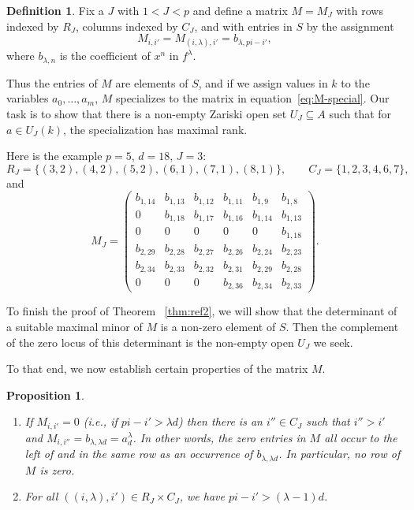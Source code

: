 \documentclass[12pt,reqno]{amsart}
\numberwithin{equation}{section}
\theoremstyle{plain}
\newtheorem{prop}[subsection]{Proposition}
\theoremstyle{definition}
\newtheorem{defn}[subsection]{Definition}
\theoremstyle{remark}
\numberwithin{equation}{section}
\newcommand{\<}{\langle}
\renewcommand{\>}{\rangle}
\begin{document}
\begin{defn}\label{def:M-generic}
Fix a $J$ with $1<J<p$ and define a matrix $M=M_J$ with rows indexed
by $R_J$, columns indexed by $C_J$, and with entries in $S$ by the
assignment
\begin{equation*}
M_{i,i'}=M_{(i,\lambda),i'}=b_{\lambda,pi-i'},
\end{equation*}
where $b_{\lambda,n}$ is the coefficient of $x^n$ in $f^\lambda$.
\end{defn}

Thus the entries of $M$ are elements of $S$, and if we assign values
in $k$ to the variables $a_0,\dots,a_m$, $M$
specializes to the matrix in equation~\eqref{eq:M-special}.  Our task
is to show that there is a non-empty Zariski open set $U_J\subseteq A$
such that for $a\in U_J(k)$, the specialization has maximal rank.

Here is the example $p=5$, $d=18$, $J=3$:
\[R_J=\{(3,2),(4,2),(5,2),(6,1),(7,1),(8,1)\},
  \qquad
  C_J=\{1,2,3,4,6,7\},\]
and
\[M_J=\begin{pmatrix}
b_{1,14}&b_{1,13}&b_{1,12}&b_{1,11}&b_{1,9}&b_{1,8}\\
0&b_{1,18}&b_{1,17}&b_{1,16}&b_{1,14}&b_{1,13}\\
0&0&0&0&0&b_{1,18}\\
b_{2,29}&b_{2,28}&b_{2,27}&b_{2,26}&b_{2,24}&b_{2,23}\\
b_{2,34}&b_{2,33}&b_{2,32}&b_{2,31}&b_{2,29}&b_{2,28}\\
0&0&0&b_{2,36}&b_{2,34}&b_{2,33}
\end{pmatrix}.
\]

To finish the proof of Theorem ~\ref{thm:ref2}, we will show that
the determinant of a suitable maximal minor of $M$ is a non-zero
element of $S$.  Then the complement of the zero locus of this
determinant is the non-empty open $U_J$ we seek.

To that end, we now establish certain properties of the matrix
$M$.

\begin{prop}\label{prop:M-props}\mbox{}
  \begin{enumerate}
  \item If $M_{i,i'}=0$ \textup{(}i.e., if $pi-i'>\lambda d$\textup{)}
    then there is an $i''\in C_J$ such that $i''>i'$ and
    $M_{i,i''}=b_{\lambda,\lambda d}=a_d^\lambda$.
    In other words, the zero entries in $M$ all occur to the left of and
    in the same row as an occurrence of $b_{\lambda,\lambda d}$.  In
    particular, no row of $M$ is zero.
  \item  For all $((i,\lambda),i')\in R_J\times C_J$, we have $pi-i'>(\lambda-1)d$.
  \end{enumerate}
\end{prop}
\end{document}
